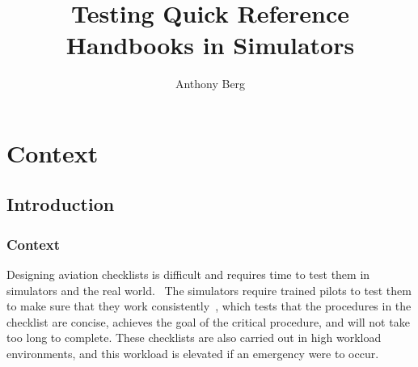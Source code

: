 \documentclass[a4paper]{article}
\author{Anthony Berg}
\title{Testing Quick Reference Handbooks in Simulators}
\newcommand{\lfcomment}[1]{\textcolor{blue}{\textbf{LF}:~#1}}
\renewcommand{\lfcomment}[1]{\relax}
\begin{document}
\begin{titlepage}
    \clearpage\maketitle 
    \thispagestyle{empty}
\end{titlepage}

\section{Context}
\subsection{Introduction}
\subsubsection*{Context}

Designing aviation checklists is difficult and requires time 
to test them in simulators and the real world.~\cite{nasa-design}
The simulators require trained pilots to test them to make 
sure that they work consistently~\cite{manifesto}, which tests 
that the procedures in the checklist are concise, achieves the goal
of the critical procedure, and will not take too long to complete.
These checklists are also carried out in high workload environments,
and this workload is elevated if an emergency were to occur.
\end{document}
